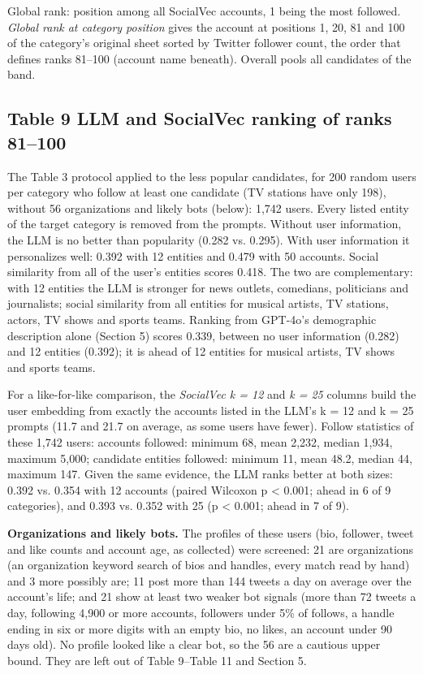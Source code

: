 \documentclass[10pt]{article}
\begin{document}
{\small Global rank: position among all SocialVec accounts, 1 being the most followed. \emph{Global rank at category position} gives the account at positions 1, 20, 81 and 100 of the category's original sheet sorted by Twitter follower count, the order that defines ranks 81--100 (account name beneath). Overall pools all candidates of the band.}

\subsection*{Table 9 \textperiodcentered{} LLM and SocialVec ranking of ranks 81--100}
The Table 3 protocol applied to the less popular candidates, for 200 random users per category who follow at least one candidate (TV stations have only 198), without 56 organizations and likely bots (below): 1,742 users. Every listed entity of the target category is removed from the prompts. Without user information, the LLM is no better than popularity (0.282 vs. 0.295). With user information it personalizes well: 0.392 with 12 entities and 0.479 with 50 accounts. Social similarity from all of the user's entities scores 0.418. The two are complementary: with 12 entities the LLM is stronger for news outlets, comedians, politicians and journalists; social similarity from all entities for musical artists, TV stations, actors, TV shows and sports teams. Ranking from GPT-4o's demographic description alone (Section 5) scores 0.339, between no user information (0.282) and 12 entities (0.392); it is ahead of 12 entities for musical artists, TV shows and sports teams.

For a like-for-like comparison, the \emph{SocialVec k = 12} and \emph{k = 25} columns build the user embedding from exactly the accounts listed in the LLM's k = 12 and k = 25 prompts (11.7 and 21.7 on average, as some users have fewer). Follow statistics of these 1,742 users: accounts followed: minimum 68, mean 2,232, median 1,934, maximum 5,000; candidate entities followed: minimum 11, mean 48.2, median 44, maximum 147. Given the same evidence, the LLM ranks better at both sizes: 0.392 vs. 0.354 with 12 accounts (paired Wilcoxon p \textless{} 0.001; ahead in 6 of 9 categories), and 0.393 vs. 0.352 with 25 (p \textless{} 0.001; ahead in 7 of 9).

\textbf{Organizations and likely bots.} The profiles of these users (bio, follower, tweet and like counts and account age, as collected) were screened: 21 are organizations (an organization keyword search of bios and handles, every match read by hand) and 3 more possibly are; 11 post more than 144 tweets a day on average over the account's life; and 21 show at least two weaker bot signals (more than 72 tweets a day, following 4,900 or more accounts, followers under 5\% of follows, a handle ending in six or more digits with an empty bio, no likes, an account under 90 days old). No profile looked like a clear bot, so the 56 are a cautious upper bound. They are left out of Table 9--Table 11 and Section 5.
\end{document}
